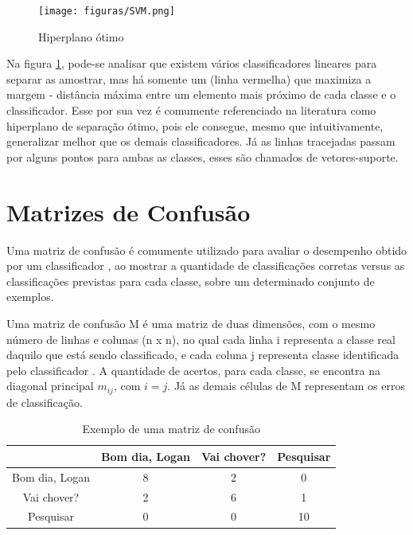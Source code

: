 \documentclass[a4paper,12pt,twoside,openright]{report}
\begin{document}
\begin{figure}[H]
	\centering
	\texttt{[image: figuras/SVM.png]}
	\caption{Hiperplano \'{o}timo}
	\label{figura:hiperplano}
\end{figure}

\par Na figura \ref{figura:hiperplano}, pode-se analisar que existem v\'{a}rios classificadores lineares para separar as amostrar, mas h\'{a} somente um (linha vermelha) que maximiza a margem - dist\^{a}ncia m\'{a}xima entre um elemento mais pr\'{o}ximo de cada classe e o classificador. Esse por sua vez \'{e} comumente referenciado na literatura como hiperplano de separa{\c c}\~{a}o \'{o}timo, pois ele consegue, mesmo que intuitivamente, generalizar melhor que os demais classificadores. J\'{a} as linhas tracejadas passam por alguns pontos para ambas as classes, esses s\~{a}o chamados de vetores-suporte.


\section{Matrizes de Confus\~{a}o}
\par Uma matriz de confus\~{a}o \'{e} comumente utilizado para avaliar o desempenho obtido por um classificador \cite{Pattern_Recognition}, ao mostrar a quantidade de classifica{\c c}\~{o}es corretas versus as classifica{\c c}\~{o}es previstas para cada classe, sobre um determinado conjunto de exemplos.
\par Uma matriz de  confus\~{a}o M \'{e} uma matriz de duas dimens\~{o}es, com o mesmo n\'{u}mero de linhas e colunas (n x n), no qual cada linha i representa a classe real daquilo que est\'{a} sendo classificado, e cada coluna j representa classe identificada pelo classificador \cite{Joao_Vitor_Maschio}. A quantidade de acertos, para cada classe, se encontra na diagonal principal $m_{ij}$, com $i = j$. J\'{a} as demais c\'{e}lulas de M representam os erros de classifica{\c c}\~{a}o.

\begin{table}[H]
	\centering
	\caption{Exemplo de uma matriz de confus\~{a}o}
	\begin{tabular}{|c || c c c |}
		\hline
		& Bom dia, Logan & Vai chover? & Pesquisar\\
		\hline
		\hline
		Bom dia, Logan & 8 & 2 & 0\\
		\hline
		Vai chover? & 2 & 6 & 1 \\
		\hline
		Pesquisar & 0 & 0 & 10\\
		\hline
	\end{tabular}
	\label{matriz_confusao}
\end{table}
\end{document}
